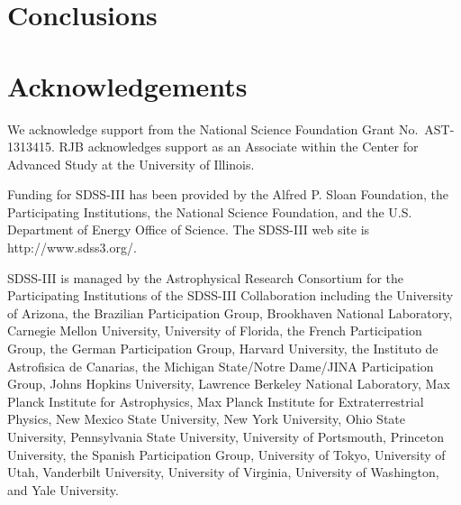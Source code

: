 \documentclass[fleqn,usenatbib]{mnras}
\begin{document}
\section{Conclusions}
  \label{sec:conclusions}

\section*{Acknowledgements}

We acknowledge support from the 
National Science Foundation Grant No.\ AST-1313415.
RJB acknowledges support as an Associate
within the Center for Advanced Study at the University of Illinois.

Funding for SDSS-III has been provided by the Alfred P. Sloan Foundation, the
Participating Institutions, the National Science Foundation, and the U.S.
Department of Energy Office of Science. The SDSS-III web site is
http://www.sdss3.org/.

SDSS-III is managed by the Astrophysical Research Consortium for the
Participating Institutions of the SDSS-III Collaboration including the
University of Arizona, the Brazilian Participation Group, Brookhaven National
Laboratory, Carnegie Mellon University, University of Florida, the French
Participation Group, the German Participation Group, Harvard University, the
Instituto de Astrofisica de Canarias, the Michigan State/Notre Dame/JINA
Participation Group, Johns Hopkins University, Lawrence Berkeley National
Laboratory, Max Planck Institute for Astrophysics, Max Planck Institute for
Extraterrestrial Physics, New Mexico State University, New York University,
Ohio State University, Pennsylvania State University, University of Portsmouth,
Princeton University, the Spanish Participation Group, University of Tokyo,
University of Utah, Vanderbilt University, University of Virginia, University
of Washington, and Yale University.

\footnotesize{


}

\bsp	%
\label{lastpage}
\end{document}
